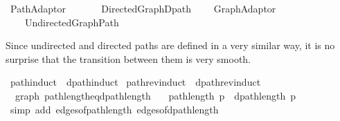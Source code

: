 %
\begin{isabellebody}%
%
%
\isadelimtheory
%
\endisadelimtheory
%
\isatagtheory
{}\isamarkupfalse%
\ Path{\isacharunderscore}{\kern0pt}Adaptor\isanewline
\ \ \isanewline
\ \ \ \ {\isachardoublequoteopen}{\isachardot}{\kern0pt}{\isachardot}{\kern0pt}{\isacharslash}{\kern0pt}Directed{\isacharunderscore}{\kern0pt}Graph{\isacharslash}{\kern0pt}Dpath{\isachardoublequoteclose}\isanewline
\ \ \ \ Graph{\isacharunderscore}{\kern0pt}Adaptor\isanewline
\ \ \ \ {\isachardoublequoteopen}{\isachardot}{\kern0pt}{\isachardot}{\kern0pt}{\isacharslash}{\kern0pt}Undirected{\isacharunderscore}{\kern0pt}Graph{\isacharslash}{\kern0pt}Path{\isachardoublequoteclose}\isanewline
{}%
\endisatagtheory
{\isafoldtheory}%
%
\isadelimtheory
%
\endisadelimtheory
%
\begin{isamarkuptext}%
Since undirected and directed paths are defined in a very similar way, it is no surprise that the
transition between them is very smooth.%
\end{isamarkuptext}\isamarkuptrue%
\isamarkupfalse%
\ path{\isacharunderscore}{\kern0pt}induct\ {\isacharequal}{\kern0pt}\ dpath{\isacharunderscore}{\kern0pt}induct\isanewline
{}\isamarkupfalse%
\ path{\isacharunderscore}{\kern0pt}rev{\isacharunderscore}{\kern0pt}induct\ {\isacharequal}{\kern0pt}\ dpath{\isacharunderscore}{\kern0pt}rev{\isacharunderscore}{\kern0pt}induct\isanewline
\isanewline
{}\isamarkupfalse%
\ {\isacharparenleft}{\kern0pt}\ graph{\isacharparenright}{\kern0pt}\ path{\isacharunderscore}{\kern0pt}length{\isacharunderscore}{\kern0pt}eq{\isacharunderscore}{\kern0pt}dpath{\isacharunderscore}{\kern0pt}length{\isacharcolon}{\kern0pt}\isanewline
\ \ \ {\isachardoublequoteopen}path{\isacharunderscore}{\kern0pt}length\ p\ {\isacharequal}{\kern0pt}\ dpath{\isacharunderscore}{\kern0pt}length\ p{\isachardoublequoteclose}\isanewline
%
\isadelimproof
\ \ %
\endisadelimproof
%
\isatagproof
{}\isamarkupfalse%
\ {\isacharparenleft}{\kern0pt}simp\ add{\isacharcolon}{\kern0pt}\ edges{\isacharunderscore}{\kern0pt}of{\isacharunderscore}{\kern0pt}path{\isacharunderscore}{\kern0pt}length\ edges{\isacharunderscore}{\kern0pt}of{\isacharunderscore}{\kern0pt}dpath{\isacharunderscore}{\kern0pt}length{\isacharparenright}{\kern0pt}%
\endisatagproof
{\isafoldproof}%
%
\isadelimproof
\isanewline
%
\endisadelimproof
\isanewline
{}\isamarkupfalse%

\end{isabellebody}
